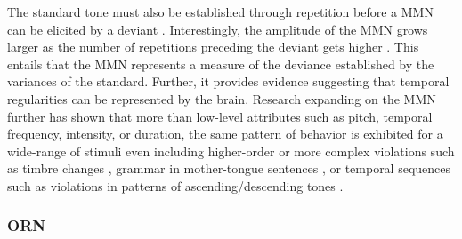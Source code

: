 \documentclass[a4paper,10pt,final]{ThesisStyle}
\begin{document}
The standard tone must also be established through repetition before a MMN can be elicited by a deviant \cite{Cowan1988}.  Interestingly, the amplitude of the MMN grows larger as the number of repetitions preceding the deviant gets higher \cite{Sams1983}.  This entails that the MMN represents a measure of the deviance established by the variances of the standard.   Further, it provides evidence suggesting that temporal regularities can be represented by the brain.  Research expanding on the MMN further has shown that more than low-level attributes such as pitch, temporal frequency, intensity, or duration, the same pattern of behavior is exhibited for a wide-range of stimuli even including higher-order or more complex violations such as timbre changes \cite{Tervaniemi1997a}, grammar in mother-tongue sentences \cite{Naatanen2001a}, or temporal sequences such as violations in patterns of ascending/descending tones \cite{Naatanen2007a,Garrido2009,Shamma2010}.


\subsubsection{ORN}
\end{document}

